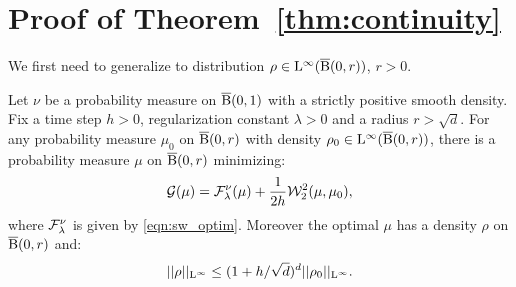
\section{Proof of Theorem~\ref{thm:continuity}}

We first need to generalize \cite[Lemma 5.4.3]{bonnotte2013unidimensional} to distribution $\rho \in \mathrm{L}^{\infty}(\operatorname{\overline{B}}(0,r))$, $r >0$.
\begin{thm} \label{thm:implicit_step}
 Let $\nu$ be a probability measure on $\operatorname{\overline{B}}(0,1)$ with a strictly positive smooth density. Fix a time step $h > 0$, regularization constant $\lambda > 0$ and a radius $r > \sqrt{d}$. For any probability measure $\mu_0$ on $\operatorname{\overline{B}}(0, r)$ with density $\rho_0 \in \mathrm{L}^{\infty}(\operatorname{\overline{B}}(0, r))$, there is a probability measure $\mu$ on $\operatorname{\overline{B}}(0,r)$ minimizing:
\[
\mathcal{G}(\mu) = \mathcal{F}^{\nu}_{\lambda} (\mu) + \frac{1}{2h} {\cal W}_2^2(\mu, \mu_0) ,
\]
where $\mathcal{F}^{\nu}_\lambda$ is given by \eqref{eqn:sw_optim}.
Moreover the optimal $\mu$ has a density $\rho$ on $\operatorname{\overline{B}}(0,r)$ and:
\begin{equation} \label{ineq:inf_norm_bound}
||\rho||_{\mathrm{L}^{\infty}} \leq (1 + h/\sqrt{d})^d ||\rho_0||_{\mathrm{L}^{\infty}}.
\end{equation}
\end{thm}
